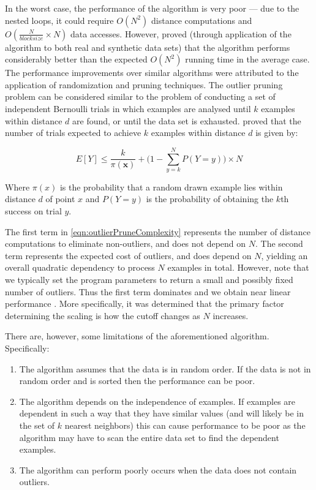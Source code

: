 In the worst case, the performance of the algorithm is very poor --- due to the 
nested loops, it could require $O(N^{2})$ distance computations and 
$O(\frac{N}{blocksize} \times N)$ data accesses. However, \citeauthor{Bay:2003} 
proved (through application of the algorithm to both real and synthetic data
sets) that the algorithm performs considerably better than the expected 
$O(N^{2})$ running time in the average case. The performance improvements over 
similar algorithms were attributed to the application of randomization and 
pruning techniques. The outlier pruning problem can be considered similar to the
problem of conducting a set of independent Bernoulli trials in which examples 
are analysed until $k$ examples within distance $d$ are found, or until the data
set is exhausted. \citeauthor{Bay:2003} proved that the number of trials 
expected to achieve $k$ examples within distance $d$ is given by:

\begin{equation}
\label{eqn:outlierPruneComplexity}
E[Y] \leq \frac{k}{\pi(\textbf{x})} + \Bigg(1 - \sum_{y=k}^{N} P(Y=y)\Bigg) \times N
\end{equation}

Where $\pi(x)$ is the probability that a random drawn example lies within 
distance $d$ of point $x$ and $P(Y=y)$ is the probability of obtaining the $k$th 
success on trial $y$.

The first term in \autoref{eqn:outlierPruneComplexity} represents the number of 
distance computations to eliminate non-outliers, and does not depend on $N$. The 
second term represents the expected cost of outliers, and does depend on $N$, 
yielding an overall quadratic dependency to process $N$ examples in total. 
However, note that we typically set the program parameters to return a small and
possibly fixed number of outliers. Thus the first term dominates and we obtain 
near linear performance \cite{Bay:2003}. More specifically, it was determined 
that the primary factor determining the scaling is how the cutoff changes as $N$ 
increases.

There are, however, some limitations of the aforementioned algorithm. 
Specifically:
\begin{enumerate}
\item The algorithm assumes that the data is in random order. If the data is not
in random order and is sorted then the performance can be poor.
\item The algorithm depends on the independence of examples. If examples are 
dependent in such a way that they have similar values (and will likely be in the
set of $k$ nearest neighbors) this can cause performance to be poor as the
algorithm may have to scan the entire data set to find the dependent examples.
\item The algorithm can perform poorly occurs when the data does not contain 
outliers.
\end{enumerate}
